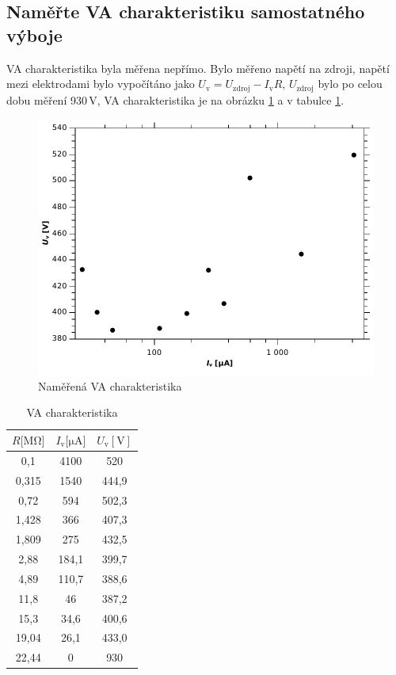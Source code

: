 \documentclass[12pt]{article}
\begin{document}
\subsection{Naměřte VA charakteristiku samostatného výboje}
VA charakteristika byla měřena nepřímo. Bylo měřeno napětí na zdroji, napětí mezi elektrodami bylo vypočítáno jako $U_\mathrm{v} = U_\mathrm{zdroj} - I_\mathrm{v}R$, $U_\mathrm{zdroj}$ bylo po celou dobu měření 930\,V, VA charakteristika je na obrázku \ref{graph3} a v tabulce \ref{VA2}.

\begin{figure}[htbp]
\begin{center}
\includegraphics[width=12cm]{Graph3.pdf}
\caption{Naměřená VA charakteristika}
\label{graph3}
\end{center}
\end{figure}

\begin{table}[htbp]
\begin{center}
\begin{tabular}{ccc}
\hline
{$R [\mathrm{M\Omega]}$} & {$I_\mathrm{v} [\mathrm{\mu A]}$} & {$U_\mathrm{v} \mathrm{[V]}$} \\
\hline \hline
0,1 & 4100 & 520 \\
0,315 & 1540 & 444,9 \\
0,72 & 594 & 502,3 \\
1,428 & 366 & 407,3 \\
1,809 & 275 & 432,5 \\
2,88 & 184,1 & 399,7 \\
4,89 & 110,7 & 388,6 \\
11,8 & 46 & 387,2 \\
15,3 & 34,6 & 400,6 \\
19,04 & 26,1 & 433,0 \\
22,44 & 0 & 930 \\
\hline
\end{tabular}
\caption{VA charakteristika}
\label{VA2}
\end{center}
\end{table}
\end{document}
